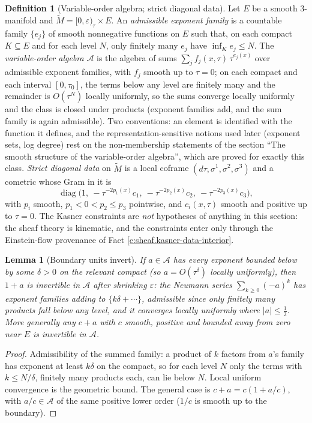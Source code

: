 \documentclass[11pt]{article}
\newtheorem{lemma}[theorem]{Lemma}
\theoremstyle{definition}
\newtheorem{definition}[theorem]{Definition}
\theoremstyle{plain}
\providecommand{\Mt}{}\renewcommand{\Mt}{\widetilde{M}}
\begin{document}
\begin{definition}[Variable-order algebra; strict diagonal data]\label{c:obj.sheaf.variable-order-algebra-strict-diagonal-data}
Let $E$ be a smooth $3$-manifold and $\Mt = [0,\varepsilon)_\tau \times E$. An \emph{admissible exponent family} is a countable family $\{e_j\}$ of smooth nonnegative functions on $E$ such that, on each compact $K \subseteq E$ and for each level $N$, only finitely many $e_j$ have $\inf_K e_j \leq N$. The \emph{variable-order algebra} $\mathcal{A}$ is the algebra of sums $\sum_j f_j(x,\tau)\,\tau^{e_j(x)}$ over admissible exponent families, with $f_j$ smooth up to $\tau = 0$; on each compact and each interval $[0, \tau_0]$, the terms below any level are finitely many and the remainder is $O(\tau^{N})$ locally uniformly, so the sums converge locally uniformly and the class is closed under products (exponent families add, and the sum family is again admissible). Two conventions: an element is identified with the function it defines, and the representation-sensitive notions used later (exponent sets, log degree) rest on the non-membership statements of the section ``The smooth structure of the variable-order algebra'', which are proved for exactly this class. \emph{Strict diagonal data} on $\Mt$ is a local coframe $(d\tau, \sigma^1, \sigma^2, \sigma^3)$ and a cometric whose Gram in it is
\[
\operatorname{diag}\bigl(1,\ -\tau^{-2p_1(x)}c_1,\ -\tau^{-2p_2(x)}c_2,\ -\tau^{-2p_3(x)}c_3\bigr),
\]
with $p_i$ smooth, $p_1 < 0 < p_2 \leq p_3$ pointwise, and $c_i(x,\tau)$ smooth and positive up to $\tau = 0$. The Kasner constraints are \emph{not} hypotheses of anything in this section: the sheaf theory is kinematic, and the constraints enter only through the Einstein-flow provenance of Fact \ref{c:sheaf.kasner-data-interior}.
\end{definition}

\begin{lemma}[Boundary units invert]\label{c:sheaf.boundary-units-invert}
If $a \in \mathcal{A}$ has every exponent bounded below by some $\delta > 0$ on the relevant compact (so $a = O(\tau^\delta)$ locally uniformly), then $1 + a$ is invertible in $\mathcal{A}$ after shrinking $\varepsilon$: the Neumann series $\sum_{k \geq 0} (-a)^k$ has exponent families adding to $\{k\delta + \cdots\}$, admissible since only finitely many products fall below any level, and it converges locally uniformly where $|a| \leq \tfrac12$. More generally any $c + a$ with $c$ smooth, positive and bounded away from zero near $E$ is invertible in $\mathcal{A}$.
\end{lemma}
\begin{proof}
Admissibility of the summed family: a product of $k$ factors from $a$'s family has exponent at least $k\delta$ on the compact, so for each level $N$ only the terms with $k \leq N/\delta$, finitely many products each, can lie below $N$. Local uniform convergence is the geometric bound. The general case is $c + a = c(1 + a/c)$, with $a/c \in \mathcal{A}$ of the same positive lower order ($1/c$ is smooth up to the boundary).

\end{proof}
\end{document}
